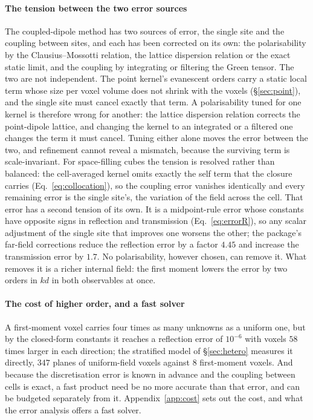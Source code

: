 \documentclass[preprint,review,12pt]{elsarticle}
\begin{document}
\paragraph{The tension between the two error sources} The coupled-dipole method has two sources
of error, the single site and the coupling between sites, and each has been corrected on its own:
the polarisability by the Clausius--Mossotti relation, the lattice dispersion relation or the exact
static limit, and the coupling by integrating or filtering the Green tensor. The two are not
independent. The point kernel's evanescent orders carry a static local term whose size per voxel
volume does not shrink with the voxels (\S\ref{sec:point}), and the single site must cancel exactly
that term. A polarisability tuned for one kernel is therefore wrong for another: the lattice
dispersion relation corrects the point-dipole lattice, and changing the kernel to an integrated or
a filtered one changes the term it must cancel. Tuning either alone moves the error between the
two, and refinement cannot reveal a mismatch, because the surviving term is scale-invariant. For
space-filling cubes the tension is resolved rather than balanced: the cell-averaged kernel omits
exactly the self term that the closure carries (Eq.~\eqref{eq:collocation}), so the coupling error
vanishes identically and every remaining error is the single site's, the variation of the field
across the cell. That error has a second tension of its own. It is a midpoint-rule error whose
constants have opposite signs in reflection and transmission (Eq.~\eqref{eq:errorR}), so any
scalar adjustment of the single site that improves one worsens the other; the package's far-field
corrections reduce the reflection error by a factor $4.45$ and increase the transmission error by
$1.7$. No polarisability, however chosen, can remove it. What removes it is a richer internal
field: the first moment lowers the error by two orders in $kd$ in both observables at once.

\paragraph{The cost of higher order, and a fast solver} A first-moment voxel carries four times as
many unknowns as a uniform one, but by the closed-form constants it reaches a reflection error of
$10^{-6}$ with voxels $58$ times larger in each direction; the stratified model of \S\ref{sec:hetero}
measures it directly, $347$ planes of uniform-field voxels against $8$ first-moment voxels. And because
the discretisation error is known in advance and the coupling between cells is exact, a fast product
need be no more accurate than that error, and can be budgeted separately from it.
Appendix~\ref{app:cost} sets out the cost, and what the error analysis offers a fast solver.
\end{document}

